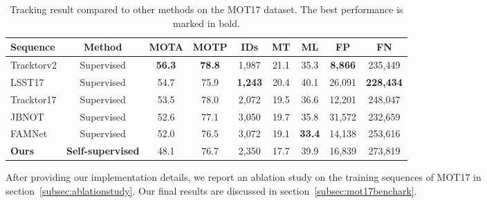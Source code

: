 \begin{table*}
	\small
	\begin{center}
		\begin{tabular}{l c c c c c c c c}
			\hline
			Sequence & Method &\textbf{MOTA} & MOTP & IDs  & MT & ML & FP & FN \\
			\hline
			Tracktorv2\cite{bergmann2019tracking} & Supervised & \textbf{56.3} & \textbf{78.8} & 1,987 & 21.1 & 35.3 & \textbf{8,866} & 235,449\\
			LSST17\cite{feng2019multi} & Supervised & 54.7 & 75.9 & \textbf{1,243}  & 20.4 & 40.1 & 26,091 & \textbf{228,434}\\
			Tracktor17\cite{bergmann2019tracking} & Supervised & 53.5 & 78.0 & 2,072 & 19.5 & 36.6 & 12,201 & 248,047 \\
			JBNOT\cite{henschel2019multiple} & Supervised & 52.6 & 77.1 & 3,050 & 19.7 & 35.8 & 31,572 & 232,659 \\
			FAMNet\cite{chu2019famnet} & Supervised & 52.0 & 76.5 & 3,072 & 19.1 & \textbf{33.4} & 14,138 & 253,616 \\
			\hline
			\textbf{Ours} & \textbf{Self-supervised} & 48.1 & 76.7 & 2,350 & 17.7 & 39.9 & 16,839 & 273,819\\
			\hline
			
		\end{tabular}
	\caption{Tracking result compared to other methods on the MOT17 dataset. The best performance is marked in bold. }
	\label{tab:mot17compare}
    \vspace*{-10mm}
	\end{center}
\end{table*}
After providing our implementation details, we report an ablation study on the training sequences of MOT17 in section~\ref{subsec:ablationstudy}. 
Our final results are discussed in section~\ref{subsec:mot17benchark}.\\

